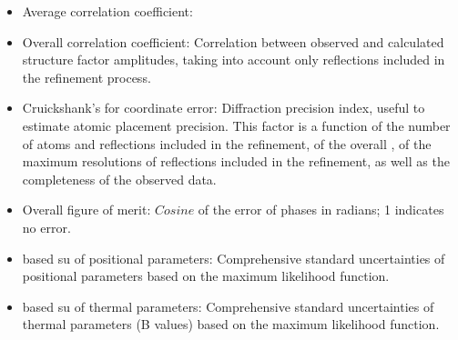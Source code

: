 \begin{itemize}
\begin{itemize}
\begin{itemize}
     \item Average correlation coefficient:
     
     \item Overall correlation coefficient: Correlation between observed and calculated structure factor amplitudes, taking into account only reflections included in the refinement process.
     
     \item Cruickshank's  for coordinate error: Diffraction precision index, useful to estimate atomic placement precision. This factor is a function of the number of atoms and reflections included in the refinement, of the overall , of the maximum resolutions of reflections included in the refinement, as well as the completeness of the observed data.
     
     \item Overall figure of merit: $Cosine$ of the error of phases in radians; 1 indicates no error.
     
     \item {} based su of positional parameters: Comprehensive standard uncertainties of positional parameters based on the maximum likelihood function.
     
     \item {} based su of thermal parameters: Comprehensive standard uncertainties of thermal parameters (B values) based on the maximum likelihood function.
     \end{itemize}
     

\end{itemize}
\end{itemize}
